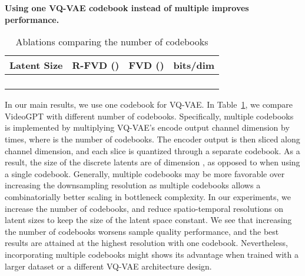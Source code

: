 \textbf{Using one VQ-VAE codebook instead of multiple improves performance.}
\begin{table}[H]
\caption{Ablations comparing the number of codebooks}
\label{table:abl_n_codebooks}
\begin{tabular}{@{}cccc@{}}
\toprule
Latent Size                    & R-FVD () & FVD () & bits/dim \\ \midrule
    &                &     &       \\
 &                &                    &                 \\
 &                &     &      \\
 &                &     &      \\ \bottomrule
\end{tabular}
\end{table}
In our main results, we use one codebook for VQ-VAE. In Table~\ref{table:abl_n_codebooks}, we compare VideoGPT with different number of codebooks. Specifically, multiple codebooks is implemented by multiplying VQ-VAE's encode output channel dimension by  times, where  is the number of codebooks. The encoder output is then sliced along channel dimension, and each slice is quantized through a separate codebook. As a result, the size of the discrete latents are of dimension , as opposed to  when using a single codebook. Generally, multiple codebooks may be more favorable over increasing the downsampling resolution as multiple codebooks allows a combinatorially better scaling in bottleneck complexity. In our experiments, we increase the number of codebooks, and reduce spatio-temporal resolutions on latent sizes to keep the size of the latent space constant. We see that increasing the number of codebooks worsens sample quality performance, and the best results are attained at the highest resolution with one codebook. Nevertheless, incorporating multiple codebooks might shows its advantage when trained with a larger dataset or a different VQ-VAE architecture design. 